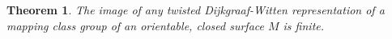 \documentclass{amsart}
\newtheorem{thm}{Theorem}[section]
\DeclareMathOperator{\Homeo}{Homeo}
\begin{document}






\begin{thm}\label{thm:closed}
The image of any twisted Dijkgraaf-Witten representation of a mapping class group of an orientable, closed surface $M$ is finite.
\end{thm}
\end{document}
